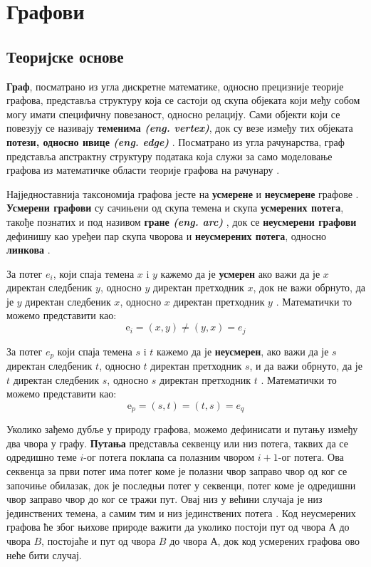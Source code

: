 \chapter{Графови}

\section{Теоријске основе}
\textbf{Граф}, посматрано из угла дискретне математике, односно прецизније теорије графова, представља структуру која се састоји од скупа објеката који међу собом могу имати специфичну повезаност, односно релацију. Сами објекти који се повезују се називају \textbf{теменима \textit{(eng. vertex)}}, док су везе између тих објеката \textbf{потези, односно ивице \textit{(eng. edge)}} \cite{graph-gt-definition}. Посматрано из угла рачунарства, граф представља апстрактну структуру података која служи за само моделовање графова из математичке области теорије графова на рачунару \cite{graph-cs-definition}.

\par
Најједноставнија таксономија графова јесте на \textbf{усмерене} и \textbf{неусмерене} графове \cite{graph-taxonomy}. \textbf{Усмерени графови} су сачињени од скупа темена и скупа \textbf{усмерених потега}, такође познатих и под називом \textbf{гране \textit{(eng. arc)}} \cite{directed-graph-definition}, док се \textbf{неусмерени графови} дефинишу као уређеи пар скупа чворова и \textbf{неусмерених потега}, односно \textbf{линкова} \cite{undirected-graph-definition}. 

\par
За потег $e_i$, који спаја темена $x$ i $y$ кажемо да је \textbf{усмерен} ако важи да је $x$ директан следбеник $y$, односно $y$ директан претходник $x$, док не важи обрнуто, да је $y$ директан следбеник $x$, односно $x$ директан претходник $y$ \cite{directed-graph-definition}. Математички то можемо представити као:
$$\text{e}_i = (x, y) \neq (y, x) = e_j$$  

\par
За потег $e_p$ који спаја темена $s$ i $t$ кажемо да је \textbf{неусмерен}, ако важи да је $s$ директан следбеник $t$, односно $t$ директан претходник $s$, и да важи обрнуто, да је $t$ директан следбеник $s$, односно $s$ директан претходник $t$ \cite{undirected-graph-definition}. Математички то можемо представити као:
$$\text{e}_p = (s, t) = (t, s) = e_q$$  

\par
Уколико зађемо дубље у природу графова, можемо дефинисати и путању између два чвора у графу. \textbf{Путања} представља секвенцу или низ потега, таквих да се одредишно теме $i$-ог потега поклапа са полазним чвором $i+1$-ог потега. Ова секвенца за први потег има потег коме је полазни чвор заправо чвор од ког се започиње обилазак, док је последњи потег у секвенци, потег коме је одредишни чвор заправо чвор до ког се тражи пут. Овај низ у већини случаја је низ јединствених темена, а самим тим и низ јединствених потега \cite{graph-path}. Код неусмерених графова ће због њихове природе важити да уколико постоји пут од чвора $А$ до чвора $B$, постојаће и пут од чвора $B$ до чвора $А$, док код усмерених графова ово неће бити случај.

